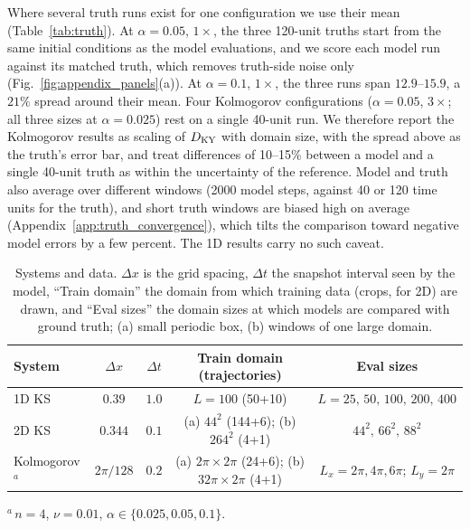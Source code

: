 Where several truth runs exist for one configuration we use their mean
(Table~\ref{tab:truth}). At $\alpha=0.05$, $1\times$, the three 120-unit
truths start from the same initial conditions as the model evaluations,
and we score each model run against its matched truth, which removes
truth-side noise only (Fig.~\ref{fig:appendix_panels}(a)). At
$\alpha=0.1$, $1\times$, the three runs span $12.9$--$15.9$, a $21\%$
spread around their mean. Four Kolmogorov configurations ($\alpha=0.05$,
$3\times$; all three sizes at $\alpha=0.025$) rest on a single 40-unit
run. We therefore report the Kolmogorov
results as scaling of $\DKY$ with domain size, with the spread above as
the truth's error bar, and treat differences of 10--15\% between a model
and a single 40-unit truth as within the uncertainty of the reference.
Model and truth also average over different windows (2000 model steps,
against 40 or 120 time units for the truth), and short truth windows are
biased high on average (Appendix~\ref{app:truth_convergence}), which tilts
the comparison toward negative model errors by a few percent. The 1D
results carry no such caveat.

\begin{table}[htbp]
\caption{Systems and data. $\Delta x$ is the grid spacing,
$\Delta t$ the snapshot interval seen by the model, ``Train domain'' the
domain from which training data (crops, for 2D) are drawn, and ``Eval sizes''
the domain sizes at which models are compared with ground truth; (a)
small periodic box, (b) windows of one large domain.}
\label{tab:systems}
\begin{ruledtabular}
\begin{tabular}{lcccc}
System & $\Delta x$ & $\Delta t$ & Train domain (trajectories) & Eval sizes \\
\hline
1D KS & $0.39$ & $1.0$ & $L=100$ (50+10) & $L=25,\,50,\,100,\,200,\,400$ \\
2D KS & $0.344$ & $0.1$ & (a) $44^2$ (144+6); (b) $264^2$ (4+1) & $44^2,\,66^2,\,88^2$ \\
Kolmogorov$^{a}$ & $2\pi/128$ & $0.2$ & (a) $2\pi\times2\pi$ (24+6); (b) $32\pi\times2\pi$ (4+1) & $L_x=2\pi,4\pi,6\pi$; $L_y=2\pi$ \\
\end{tabular}
\end{ruledtabular}
\footnotesize{$^{a}$\,$n=4$, $\nu=0.01$, $\alpha\in\{0.025,0.05,0.1\}$.}
\end{table}

\begin{table}[htbp]
\caption{Ground-truth Kaplan--Yorke dimensions. $T$ is the averaging
window in time units; the number in parentheses is the number of
independent runs (1D: distinct finite-time realizations, see
Appendix~\ref{app:groundtruth}). Density is $\DKY$ per unit length (1D KS), per unit area
(2D KS), or per $2\pi\times2\pi$ box (Kolm., Kolmogorov flow, here and in
every table). Values in bold are the
references used in the paper (means where several runs exist).}
\label{tab:truth}
\end{table}
